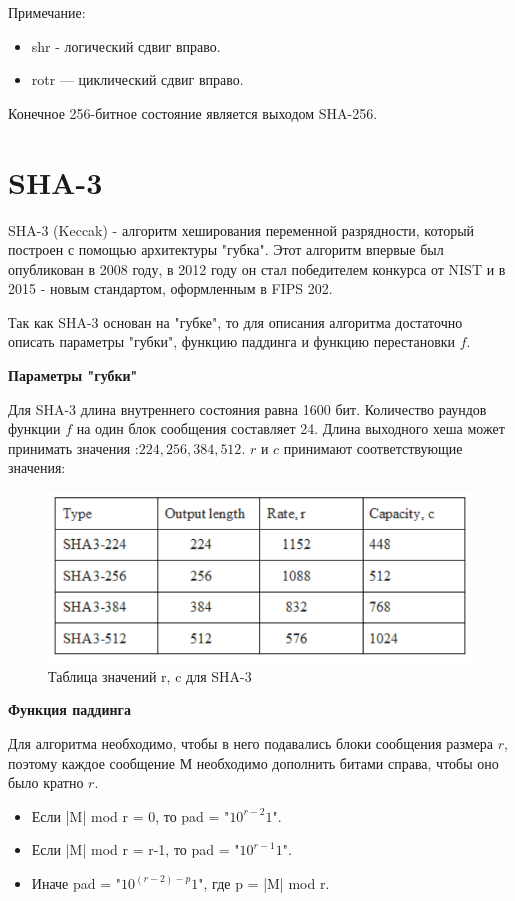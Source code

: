 \documentclass[colorthm]{./civarticle}
\begin{document}
Примечание:

\begin{itemize}
        \item shr - логический сдвиг вправо.
        \item rotr — циклический сдвиг вправо.
\end{itemize}

Конечное 256-битное состояние является выходом SHA-256.

\section{SHA-3}
SHA-3 (Keccak) - алгоритм хеширования переменной разрядности, который построен с помощью архитектуры "губка". Этот алгоритм впервые был опубликован в 2008 году, в 2012 году он стал победителем конкурса от NIST и в 2015 - новым стандартом, оформленным в FIPS 202.

Так как SHA-3 основан на "губке", то для описания алгоритма достаточно описать параметры "губки", функцию паддинга и функцию перестановки $f$.

\textbf{Параметры "губки"}

Для SHA-3 длина внутреннего состояния равна 1600 бит. Количество раундов функции $f$ на один блок сообщения составляет 24. Длина выходного хеша может принимать значения :${224, 256, 384, 512}$. $r$ и $c$ принимают соответствующие значения:

\begin{figure}[H]
    \centering
    \includegraphics[width=0.6\linewidth]{sha3_rates.png}
    \caption{Таблица значений r, c для SHA-3}
    \label{fig:enter-label}
\end{figure}

\textbf{Функция паддинга}

Для алгоритма необходимо, чтобы в него подавались блоки сообщения размера $r$, поэтому каждое сообщение М необходимо дополнить битами справа, чтобы оно было кратно $r$.

\begin{itemize}
    \item Если |M| mod r = 0, то pad = "$10^{r-2}1$".
    \item Если |M| mod r = r-1, то pad = "$10^{r-1}1$".
    \item Иначе pad = "$10^{(r-2)-p}1$", где p = |M| mod r.
\end{itemize}
\end{document}
